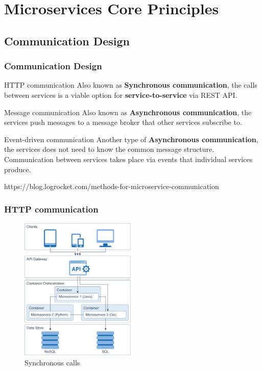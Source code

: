 \documentclass{beamer}
\begin{document}
\section {Microservices Core Principles}
	\subsection {Communication Design}
		\begin{frame}
			\frametitle{Communication Design}
				\begin{block} {HTTP communication}
					Also known as \textbf{Synchronous communication}, the calls between services is a viable option for \textbf{service-to-service} via REST API.
				\end{block}
				
				\vspace{2mm}
				\begin{block} {Message communication}
					Also known as \textbf{Asynchronous communication}, the services push messages to a message broker that other services subscribe to.
				\end{block}
			
			\vspace{2mm}
			\begin{block} {Event-driven communication}
				Another type of \textbf{Asynchronous communication}, the services does not need to know the common message structure. Communication between services takes place via events that individual services produce.
			\end{block}
		
		\vspace{5mm}
		\tiny {https://blog.logrocket.com/methods-for-microservice-communication}
		\end{frame}
	
	\begin{frame}
		\frametitle{HTTP communication}
			\begin{figure}[h]
				\includegraphics[width=55mm, scale=1]{img/microservice_architecture.png}
				\caption{Synchronous calls}
			\end{figure}
	\end{frame}
\end{document}
